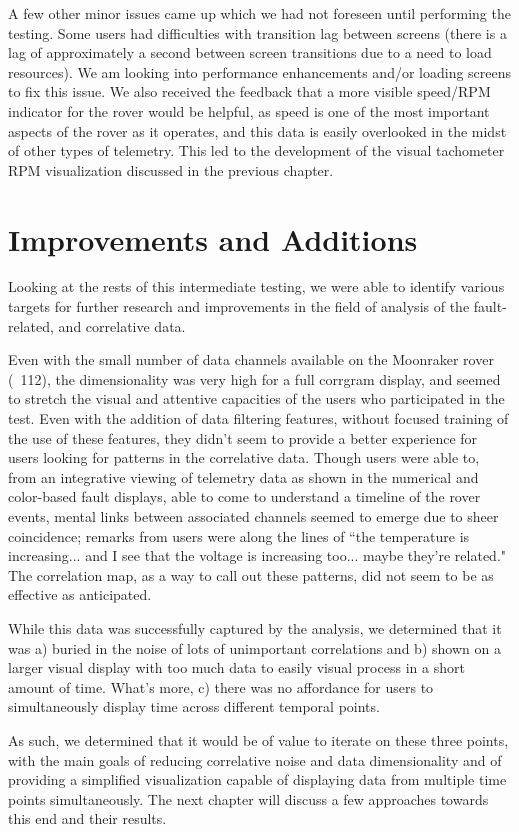 A few other minor issues came up which we had not foreseen until performing the testing. Some users had difficulties with transition lag between screens (there is a lag of approximately a second between screen transitions due to a need to load resources). We am looking into performance enhancements and/or loading screens to fix this issue. We also received the feedback that a more visible speed/RPM indicator for the rover would be helpful, as speed is one of the most important aspects of the rover as it operates, and this data is easily overlooked in the midst of other types of telemetry. This led to the development of the visual tachometer RPM visualization discussed in the previous chapter.

\section{Improvements and Additions}

Looking at the rests of this intermediate testing, we were able to identify various targets for further research and improvements in the field of analysis of the fault-related, and correlative data.

Even with the small number of data channels available on the Moonraker rover (~112), the dimensionality was very high for a full corrgram display, and seemed to stretch the visual and attentive capacities of the users who participated in the test. Even with the addition of data filtering features, without focused training of the use of these features, they didn't seem to provide a better experience for users looking for patterns in the correlative data. Though users were able to, from an integrative viewing of telemetry data as shown in the numerical and color-based fault displays, able to come to understand a timeline of the rover events, mental links between associated channels seemed to emerge due to sheer coincidence; remarks from users were along the lines of ``the temperature is increasing... and I see that the voltage is increasing too... maybe they're related." The correlation map, as a way to call out these patterns, did not seem to be as effective as anticipated.

While this data was successfully captured by the analysis, we determined that it was a) buried in the noise of lots of unimportant correlations and b) shown on a larger visual display with too much data to easily visual process in a short amount of time. What's more, c) there was no affordance for users to simultaneously display time across different temporal points.

As such, we determined that it would be of value to iterate on these three points, with the main goals of reducing correlative noise and data dimensionality and of providing a simplified visualization capable of displaying data from multiple time points simultaneously. The next chapter will discuss a few approaches towards this end and their results.